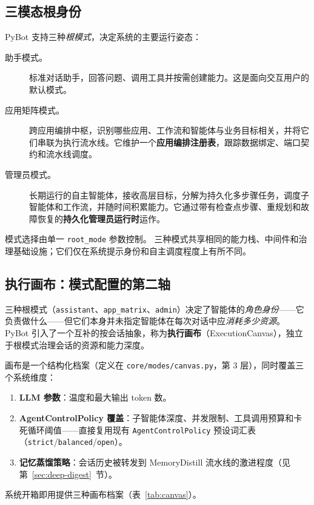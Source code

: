 \documentclass[11pt,a4paper]{article}
\begin{document}
\subsection{三模态根身份}

PyBot 支持三种\emph{根模式}，决定系统的主要运行姿态：

\begin{description}
  \item[助手模式。] 标准对话助手，回答问题、调用工具并按需创建能力。这是面向交互用户的默认模式。
  \item[应用矩阵模式。] 跨应用编排中枢，识别哪些应用、工作流和智能体与业务目标相关，并将它们串联为执行流水线。它维护一个\textbf{应用编排注册表}，跟踪数据绑定、端口契约和流水线调度。
  \item[管理员模式。] 长期运行的自主智能体，接收高层目标，分解为持久化多步骤任务，调度子智能体和工作流，并随时间积累能力。它通过带有检查点步骤、重规划和故障恢复的\textbf{持久化管理员运行时}运作。
\end{description}

模式选择由单一 \texttt{root\_mode} 参数控制。
三种模式共享相同的能力栈、中间件和治理基础设施；它们仅在系统提示身份和自主调度程度上有所不同。

\subsection{执行画布：模式配置的第二轴}
\label{sec:canvas}

三种根模式（\texttt{assistant}、\texttt{app\_matrix}、\texttt{admin}）决定了智能体的\emph{角色身份}——它负责做什么——但它们本身并未指定智能体在每次对话中应\emph{消耗多少资源}。
PyBot 引入了一个互补的按会话抽象，称为\textbf{执行画布}（ExecutionCanvas），独立于根模式治理会话的资源和能力深度。

画布是一个结构化档案（定义在 \texttt{core/modes/canvas.py}，第 3 层），同时覆盖三个系统维度：
\begin{enumerate}
  \item \textbf{LLM 参数}：温度和最大输出 token 数。
  \item \textbf{AgentControlPolicy 覆盖}：子智能体深度、并发限制、工具调用预算和卡死循环阈值——直接复用现有 \texttt{AgentControlPolicy} 预设词汇表（\texttt{strict}/\texttt{balanced}/\texttt{open}）。
  \item \textbf{记忆蒸馏策略}：会话历史被转发到 MemoryDistill 流水线的激进程度（见第~\ref{sec:deep-digest}~节）。
\end{enumerate}

系统开箱即用提供三种画布档案（表~\ref{tab:canvas}）。
\end{document}
